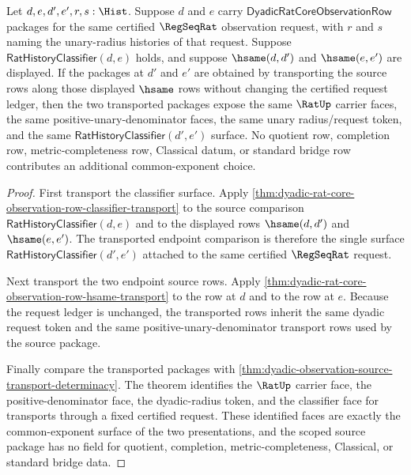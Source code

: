 \begin{theorem}
\label{thm:dyadic-observation-common-exponent-determinacy}
Let $d,e,d',e',r,s:\Hist$. Suppose $d$ and $e$ carry
$\mathsf{DyadicRatCoreObservationRow}$ packages for the same certified
$\RegSeqRat$ observation request, with $r$ and $s$ naming the unary-radius
histories of that request. Suppose
$\mathsf{RatHistoryClassifier}(d,e)$ holds, and suppose $\hsame(d,d')$ and
$\hsame(e,e')$ are displayed. If the packages at $d'$ and $e'$ are obtained by
transporting the source rows along those displayed $\hsame$ rows without
changing the certified request ledger, then the two transported packages
expose the same $\RatUp$ carrier faces, the same positive-unary-denominator
faces, the same unary radius/request token, and the same
$\mathsf{RatHistoryClassifier}(d',e')$ surface. No quotient row, completion
row, metric-completeness row, Classical datum, or standard bridge row
contributes an additional common-exponent choice.
\end{theorem}
\begin{proof}
First transport the classifier surface. Apply
\autoref{thm:dyadic-rat-core-observation-row-classifier-transport} to the
source comparison $\mathsf{RatHistoryClassifier}(d,e)$ and to the displayed
rows $\hsame(d,d')$ and $\hsame(e,e')$. The transported endpoint comparison is
therefore the single surface $\mathsf{RatHistoryClassifier}(d',e')$ attached
to the same certified $\RegSeqRat$ request.

Next transport the two endpoint source rows. Apply
\autoref{thm:dyadic-rat-core-observation-row-hsame-transport} to the row at
$d$ and to the row at $e$. Because the request ledger is unchanged, the
transported rows inherit the same dyadic request token and the same
positive-unary-denominator transport rows used by the source package.

Finally compare the transported packages with
\autoref{thm:dyadic-observation-source-transport-determinacy}. The theorem
identifies the $\RatUp$ carrier face, the positive-denominator face, the
dyadic-radius token, and the classifier face for transports through a fixed
certified request. These identified faces are exactly the common-exponent
surface of the two presentations, and the scoped source package has no field
for quotient, completion, metric-completeness, Classical, or standard bridge
data.
\end{proof}

